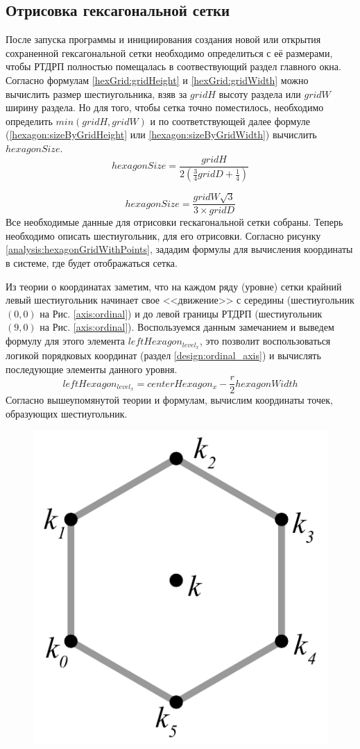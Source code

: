 \subsection{Отрисовка гексагональной сетки}
\label{design:paint_hex_grid}
После запуска программы и инициирования создания новой или открытия сохраненной гексагональной сетки необходимо определиться с её размерами, чтобы РТДРП полностью помещалась в соотвествующий раздел главного окна. Согласно формулам \ref{hexGrid:gridHeight} и \ref{hexGrid:gridWidth} можно вычислить размер шестиугольника, взяв за $gridH$ высоту раздела или $gridW$ ширину раздела. Но для того, чтобы сетка точно поместилось, необходимо определить $min(gridH, gridW)$ и по соответствующей далее формуле (\ref{hexagon:sizeByGridHeight} или \ref{hexagon:sizeByGridWidth})  вычислить $hexagonSize$.
\begin{equation}
\label{hexagon:sizeByGridHeight}
hexagonSize = \frac{gridH}{2( \frac{3}{4}gridD+\frac{1}{4} )}
\end{equation}

\begin{equation}
\label{hexagon:sizeByGridWidth}
hexagonSize = \frac{gridW\sqrt{3}}{3\times gridD}
\end{equation}
Все необходимые данные для отрисовки гескагональной сетки собраны. Теперь необходимо описать шестиугольник, для его отрисовки. Согласно рисунку \ref{analysis:hexagonGridWithPoints}, зададим формулы для вычисления координаты в системе, где будет отображаться сетка. 
\par 
Из теории о координатах заметим, что на каждом ряду (уровне) сетки крайний левый шестиугольник начинает свое <<движение>> с середины (шестиугольник $(0,0)$ на Рис. \ref{axis:ordinal}) и до левой границы РТДРП (шестиугольник $(9,0)$ на Рис. \ref{axis:ordinal}). Воспользуемся данным замечанием и выведем формулу для этого элемента $leftHexagon_{level_{x}}$, это позволит воспользоваться логикой порядковых координат (раздел \ref{design:ordinal_axis}) и вычислять последующие элементы данного уровня.
\begin{equation}
\label{hex:leftHex}
leftHexagon_{level_{x}} = centerHexagon_{x} - \frac{r}{2}hexagonWidth
\end{equation}
Согласно вышеупомянутой теории и формулам, вычислим координаты точек, образующих шестиугольник.
\begin{figure}[h]
	\centering
	\includegraphics[width=0.25\linewidth]{inc/img/hexagon_edges}
	\caption{}
	\label{fig:}
\end{figure}


